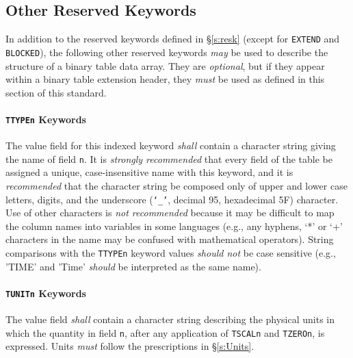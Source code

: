 \documentclass[11pt,makeidx]{book}     %
\begin{document}
 \subsection{Other Reserved Keywords}
 \label{s:btork}
  In addition to the reserved keywords defined in  \S\ref{s:resk} (except for  
  {\tt EXTEND} and {\tt BLOCKED}), 
   the following other reserved keywords
  {\em may} be used to describe the structure of a
  binary table data array. They are {\em optional}, but if they
  appear within a binary table extension header, they {\em must}
  be used as defined in this section of this standard. 
 
   \paragraph{{\tt TTYPEn} Keywords} 
 The value field for this indexed keyword {\em shall} contain a
 character string giving the name of field {\tt n}.  
 It is {\em strongly recommended} that every field of the table be 
 assigned a unique, case-insensitive  name with this keyword, and it is 
 {\em recommended} that the character string be composed only of upper and 
 lower case letters, digits,  and the underscore ({\tt `\_'}, decimal 95, 
 hexadecimal 5F) character.  Use of other characters is {\em not recommended} 
 because it may be difficult to map the column names into variables in some
 languages (e.g., any hyphens, `*'  or `+' characters in the name may be confused
 with mathematical operators).
 String comparisons with the {\tt TTYPEn} keyword values {\em should not}
 be case sensitive (e.g., 'TIME' and 'Time' {\em should} be interpreted as the 
 same name).
 
   \paragraph{{\tt TUNITn} Keywords}
 The value field {\em shall} contain a character 
 string describing the physical units 
 in which the quantity in field 
 {\tt n}, after any application of {\tt TSCALn}
 and {\tt TZEROn}, is expressed.  Units {\em must} follow the 
 prescriptions in \S\ref{s:Units}.       
\end{document}
